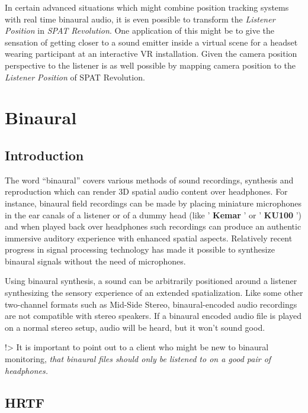 \documentclass[
  letterpaper,
  DIV=11,
  numbers=noendperiod]{scrreport}
\begin{document}
In certain advanced situations which might combine position tracking
systems with real time binaural audio, it is even possible to transform
the \emph{Listener Position} in \emph{SPAT Revolution}. One application
of this might be to give the sensation of getting closer to a sound
emitter inside a virtual scene for a headset wearing participant at an
interactive VR installation. Given the camera position perspective to
the listener is as well possible by mapping camera position to the
\emph{Listener Position} of SPAT Revolution.

\hypertarget{binaural}{%
\chapter{Binaural}\label{binaural}}

\hypertarget{introduction}{%
\section{Introduction}\label{introduction}}

The word ``binaural'' covers various methods of sound recordings,
synthesis and reproduction which can render 3D spatial audio content
over headphones. For instance, binaural field recordings can be made by
placing miniature microphones in the ear canals of a listener or of a
dummy head (like ' \textbf{Kemar} ' or ' \textbf{KU100} ') and when
played back over headphones such recordings can produce an authentic
immersive auditory experience with enhanced spatial aspects. Relatively
recent progress in signal processing technology has made it possible to
synthesize binaural signals without the need of microphones.

Using binaural synthesis, a sound can be arbitrarily positioned around a
listener synthesizing the sensory experience of an extended
spatialization. Like some other two-channel formats such as Mid-Side
Stereo, binaural-encoded audio recordings are not compatible with stereo
speakers. If a binaural encoded audio file is played on a normal stereo
setup, audio will be heard, but it won't sound good.

!\textgreater{} It is important to point out to a client who might be
new to binaural monitoring, \emph{that binaural files should only be
listened to on a good pair of headphones.}

\hypertarget{hrtf}{%
\section{HRTF}\label{hrtf}}
\end{document}

